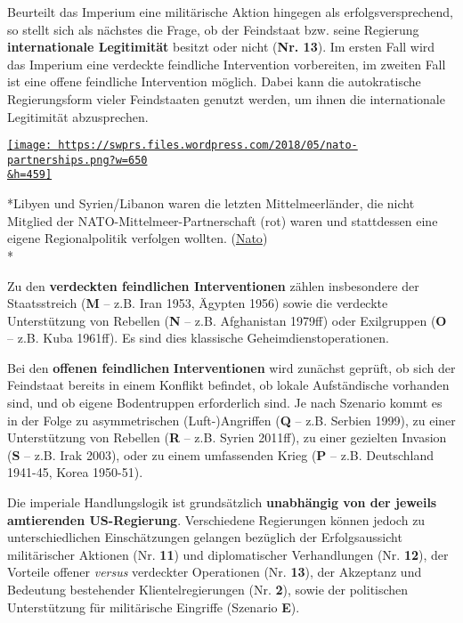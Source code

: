 Beurteilt das Imperium eine militärische Aktion hingegen als
erfolgsversprechend, so stellt sich als nächstes die Frage, ob der
Feindstaat bzw. seine Regierung \textbf{internationale Legitimität}
besitzt oder nicht (\textbf{Nr. 13}). Im ersten Fall wird das Imperium
eine verdeckte feindliche Intervention vorbereiten, im zweiten Fall ist
eine offene feindliche Intervention möglich. Dabei kann die
autokratische Regierungsform vieler Feindstaaten genutzt werden, um
ihnen die internationale Legitimität abzusprechen.

\href{https://swprs.files.wordpress.com/2018/05/nato-partnerships.png}{\texttt{[image: https://swprs.files.wordpress.com/2018/05/nato-partnerships.png?w=650\\\&h=459]}}

*Libyen und Syrien/Libanon waren die letzten Mittelmeerländer, die nicht
Mitglied der NATO-Mittelmeer-Partnerschaft (rot) waren und stattdessen
eine eigene Regionalpolitik verfolgen wollten.
(\href{https://www.nato.int/cps/ua/natohq/topics_81136.htm}{Nato})\\
*

Zu den \textbf{verdeckten feindlichen Interventionen} zählen
insbesondere der Staatsstreich (\textbf{M} -- z.B. Iran 1953, Ägypten
1956) sowie die verdeckte Unterstützung von Rebellen (\textbf{N} -- z.B.
Afghanistan 1979ff) oder Exilgruppen (\textbf{O} -- z.B. Kuba 1961ff).
Es sind dies klassische Geheimdienstoperationen.

Bei den \textbf{offenen feindlichen} \textbf{Interventionen} wird
zunächst geprüft, ob sich der Feindstaat bereits in einem Konflikt
befindet, ob lokale Aufständische vorhanden sind, und ob eigene
Bodentruppen erforderlich sind. Je nach Szenario kommt es in der Folge
zu asymmetrischen (Luft-)Angriffen (\textbf{Q} -- z.B. Serbien 1999), zu
einer Unterstützung von Rebellen (\textbf{R} -- z.B. Syrien 2011ff), zu
einer gezielten Invasion (\textbf{S} -- z.B. Irak 2003), oder zu einem
umfassenden Krieg (\textbf{P} -- z.B. Deutschland 1941-45, Korea
1950-51).

Die imperiale Handlungslogik ist grundsätzlich \textbf{unabhängig von
der jeweils amtierenden US-Regierung}. Verschiedene Regierungen können
jedoch zu unterschiedlichen Einschätzungen gelangen bezüglich der
Erfolgsaussicht militärischer Aktionen (Nr. \textbf{11}) und
diplomatischer Verhandlungen (Nr. \textbf{12}), der Vorteile offener
\emph{versus} verdeckter Operationen (Nr. \textbf{13}), der Akzeptanz
und Bedeutung bestehender Klientelregierungen (Nr. \textbf{2}), sowie
der politischen Unterstützung für militärische Eingriffe (Szenario
\textbf{E}).

